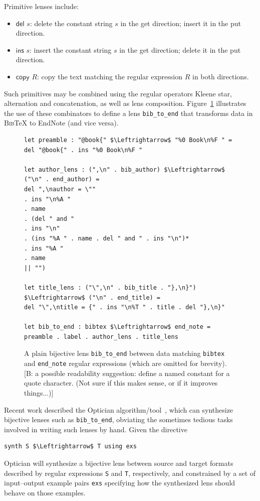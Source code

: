 \documentclass[acmsmall,review,anonymous]{acmart}
\newcommand{\FINISH}[3]{\ifdraft\textcolor{#1}{[#2: #3]}\fi}
\newcommand{\bcp}[1]{\FINISH{dkred}{B}{#1}}
\newcommand{\kw}[1]{\textcolor{dkred}{\ensuremath{\mathsf{#1}}}}
\newcommand{\bibtex}{\textsc{Bib}\TeX{}}
\newcommand{\cd}[1]{\lstinline[backgroundcolor=\color{white}]$#1$}
\begin{document}
Primitive lenses include:
\begin{itemize}
  \item \kw{del} $s$: delete the constant string $s$ in the get
  direction; insert it in the put direction.
  \item \kw{ins} $s$: insert the constant string $s$ in the get
  direction; delete it in the put direction.
  \item \kw{copy} $R$: copy the text matching the regular expression $R$ in
  both directions.
\end{itemize}
Such primitives may be combined using the regular operators
Kleene star, alternation and concatenation, as well as lens composition.
Figure~\ref{fig:example-lens} illustrates the use of these
combinators to define a lens \cd{bib_to_end} that transforms data
in \bibtex{} to EndNote (and vice versa). 
\begin{figure}[t]
\begin{lstlisting}
let preamble : "@book{" $\Leftrightarrow$ "%0 Book\n%F " =
del "@book{" . ins "%0 Book\n%F "

let author_lens : (",\n" . bib_author) $\Leftrightarrow$ ("\n" . end_author) =
del ",\nauthor = \""
. ins "\n%A "
. name
. (del " and "
. ins "\n"
. (ins "%A " . name . del " and " . ins "\n")*
. ins "%A "
. name
|| "")

let title_lens : ("\",\n" . bib_title . "},\n}") $\Leftrightarrow$ ("\n" . end_title) =
del "\",\ntitle = {" . ins "\n%T " . title . del "},\n}"

let bib_to_end : bibtex $\Leftrightarrow$ end_note = preamble . label . author_lens . title_lens
\end{lstlisting}
\caption{A plain bijective lens \cd{bib_to_end} between data
matching \cd{bibtex} and \cd{end_note} regular 
expressions (which are omitted for brevity).  
\iflastminute
\bcp{a possible readability suggestion: define a named constant for a quote
  character.  (Not sure if this makes sense, or if it improves things...)}
\fi}
\label{fig:example-lens}
\end{figure}

Recent work described the Optician
algorithm/tool~\cite{optician}, which can synthesize bijective lenses
such as \cd{bib_to_end}, obviating the sometimes tedious tasks
involved in writing such lenses by hand.  Given the directive
\begin{lstlisting}
synth S $\Leftrightarrow$ T using exs
\end{lstlisting}
\noindent
Optician will synthesize a bijective lens between 
source and target formats described by regular expressions
\cd{S} and \cd{T}, respectively, and constrained by a set of input--output example pairs \cd{exs} specifying how
the synthesized lens should behave on those examples.
\end{document}
